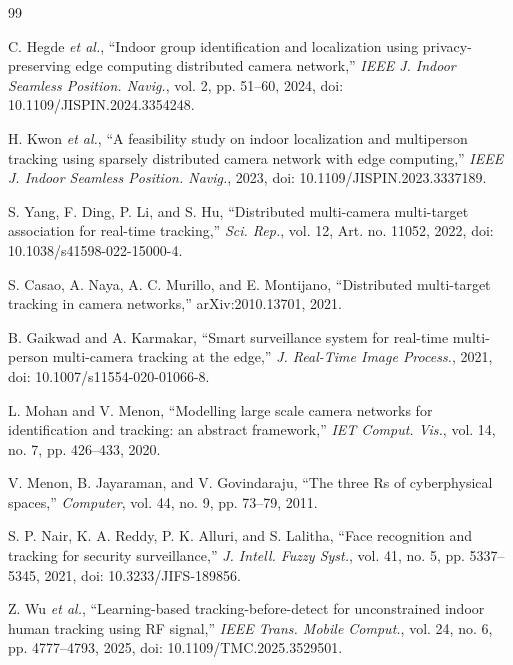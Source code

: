 \documentclass[12pt,a4paper,oneside]{report}
\begin{document}
\begin{thebibliography}{99}
{}

\setlength{\itemsep}{6pt}
\setlength{\parskip}{0pt}

C. Hegde \textit{et al.},
``Indoor group identification and localization using privacy-preserving edge computing distributed camera network,''
\textit{IEEE J. Indoor Seamless Position. Navig.},
vol. 2, pp. 51--60,
2024, doi: 10.1109/JISPIN.2024.3354248.

H. Kwon \textit{et al.},
``A feasibility study on indoor localization and multiperson tracking using sparsely distributed camera network with edge computing,''
\textit{IEEE J. Indoor Seamless Position. Navig.},
2023, doi: 10.1109/JISPIN.2023.3337189.

S. Yang, F. Ding, P. Li, and S. Hu,
``Distributed multi-camera multi-target association for real-time tracking,''
\textit{Sci. Rep.},
vol. 12,
Art. no. 11052, 2022,
doi: 10.1038/s41598-022-15000-4.

S. Casao, A. Naya, A. C. Murillo, and E. Montijano,
``Distributed multi-target tracking in camera networks,''
arXiv:2010.13701, 2021.

B. Gaikwad and A. Karmakar,
``Smart surveillance system for real-time multi-person multi-camera tracking at the edge,''
\textit{J. Real-Time Image Process.},
2021, doi: 10.1007/s11554-020-01066-8.

L. Mohan and V. Menon,
``Modelling large scale camera networks for identification and tracking: an abstract framework,''
\textit{IET Comput. Vis.},
vol. 14, no. 7, pp. 426--433,
2020.

V. Menon, B. Jayaraman, and V. Govindaraju,
``The three Rs of cyberphysical spaces,''
\textit{Computer},
vol. 44, no. 9, pp. 73--79,
2011.

S. P. Nair, K. A. Reddy, P. K. Alluri, and S. Lalitha,
``Face recognition and tracking for security surveillance,''
\textit{J. Intell. Fuzzy Syst.},
vol. 41, no. 5, pp. 5337--5345,
2021, doi: 10.3233/JIFS-189856.

Z. Wu \textit{et al.},
``Learning-based tracking-before-detect for unconstrained indoor human tracking using RF signal,''
\textit{IEEE Trans. Mobile Comput.},
vol. 24, no. 6, pp. 4777--4793,
2025, doi: 10.1109/TMC.2025.3529501.


\end{thebibliography}
\end{document}
